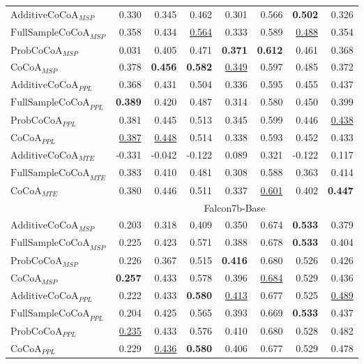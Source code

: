 \begin{table*}[h!]
\begin{tabular}{lrrrrrrr}
$\text{AdditiveCoCoA}_{MSP}$ & 0.330& 0.345& 0.462& 0.301& 0.566& \textbf{0.502}& 0.326\\
$\text{FullSampleCoCoA}_{MSP}$ & 0.358& 0.434& \underline{0.564}& 0.333& 0.589& \underline{0.488}& 0.354\\
$\text{ProbCoCoA}_{MSP}$ & 0.031& 0.405& 0.471& \textbf{0.371}& \textbf{0.612}& 0.461& 0.368\\
$\text{CoCoA}_{MSP}$ & 0.378& \textbf{0.456}& \textbf{0.582}& \underline{0.349}& 0.597& 0.485& 0.372\\

\midrule

$\text{AdditiveCoCoA}_{PPL}$ & 0.368& 0.431& 0.504& 0.336& 0.595& 0.455& 0.437\\
$\text{FullSampleCoCoA}_{PPL}$ & \textbf{0.389}& 0.420& 0.487& 0.314& 0.580& 0.450& 0.399\\
$\text{ProbCoCoA}_{PPL}$ & 0.381& 0.445& 0.513& 0.345& 0.599& 0.446& \underline{0.438}\\
$\text{CoCoA}_{PPL}$ & \underline{0.387}& \underline{0.448}& 0.514& 0.338& 0.593& 0.452& 0.433\\

\midrule

$\text{AdditiveCoCoA}_{MTE}$ & -0.331& -0.042& -0.122& 0.089& 0.321& -0.122& 0.117\\
$\text{FullSampleCoCoA}_{MTE}$ & 0.383& 0.410& 0.481& 0.308& 0.588& 0.363& 0.414\\
$\text{CoCoA}_{MTE}$ & 0.380& 0.446& 0.511& 0.337& \underline{0.601}& 0.402& \textbf{0.447}\\
\midrule

\rowcolor[gray]{0.9} & \multicolumn{7}{c}{Falcon7b-Base} \\

\midrule

$\text{AdditiveCoCoA}_{MSP}$ & 0.203& 0.318& 0.409& 0.350& 0.674& \textbf{0.533}& 0.379\\
$\text{FullSampleCoCoA}_{MSP}$ & 0.225& 0.423& 0.571& 0.388& 0.678& \textbf{0.533}& 0.404\\
$\text{ProbCoCoA}_{MSP}$ & 0.226& 0.367& 0.515& \textbf{0.416}& 0.680& 0.526& 0.426\\
$\text{CoCoA}_{MSP}$ & \textbf{0.257}& 0.433& 0.578& 0.396& \underline{0.684}& 0.529& 0.436\\

\midrule

$\text{AdditiveCoCoA}_{PPL}$ & 0.222& 0.433& \textbf{0.580}& \underline{0.413}& 0.677& 0.525& \underline{0.489}\\
$\text{FullSampleCoCoA}_{PPL}$ & 0.204& 0.425& 0.565& 0.393& 0.669& \textbf{0.533}& 0.437\\
$\text{ProbCoCoA}_{PPL}$ & \underline{0.235}& 0.433& 0.576& 0.410& 0.680& 0.528& 0.482\\
$\text{CoCoA}_{PPL}$ & 0.229& \underline{0.436}& \textbf{0.580}& 0.406& 0.677& 0.529& 0.478\\


\end{tabular}
\end{table*}

